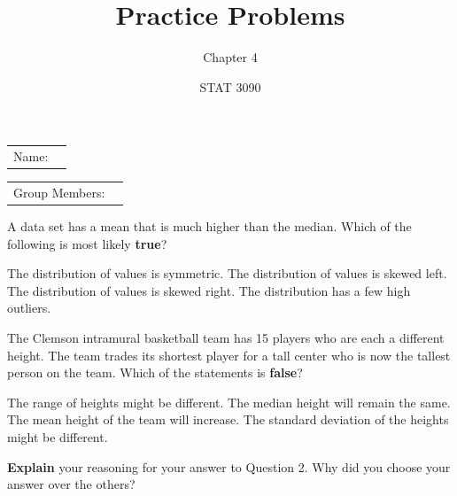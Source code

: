 \documentclass[noanswers]{exam}
\title{Practice Problems}
\author{Chapter 4}
\date{STAT 3090}
\begin{document}
\noindent\begin{tabular}{@{}p{.3in}p{3in}@{}}
Name: & \hrulefill
\end{tabular}

\vspace{2mm}

\noindent\begin{tabular}{@{}p{1.05in}p{3.2in}@{}}
Group Members: & \hrulefill
\end{tabular}

\begin{questions} 
	
	\question A data set has a mean that is much higher than the median. Which of the following is most likely \textbf{true}?
	
	\vspace{2mm}
	
	\begin{choices}
	
		\choice The distribution of values is symmetric.
		\choice The distribution of values is skewed left.
		\CorrectChoice The distribution of values is skewed right.
		\choice The distribution has a few high outliers.	
	
	\end{choices}
	
	\vspace{3mm}
	
	\question The Clemson intramural basketball team has 15 players who are each a different height. The team trades its shortest player for a tall center who is now the tallest person on the team. Which of the statements is \textbf{false}?
	
	\vspace{2mm}
	
	\begin{choices}
	
		\choice The range of heights might be different.
		\CorrectChoice The median height will remain the same.
		\choice The mean height of the team will increase.
		\choice The standard deviation of the heights might be different.	
	
	\end{choices}
	
	\vspace{3mm}
	
	\question \textbf{Explain} your reasoning for your answer to Question 2. Why did you choose your answer over the others?
	
	\begin{solution}[\stretch{1}]
	

\end{solution}
\end{questions}
\end{document}
